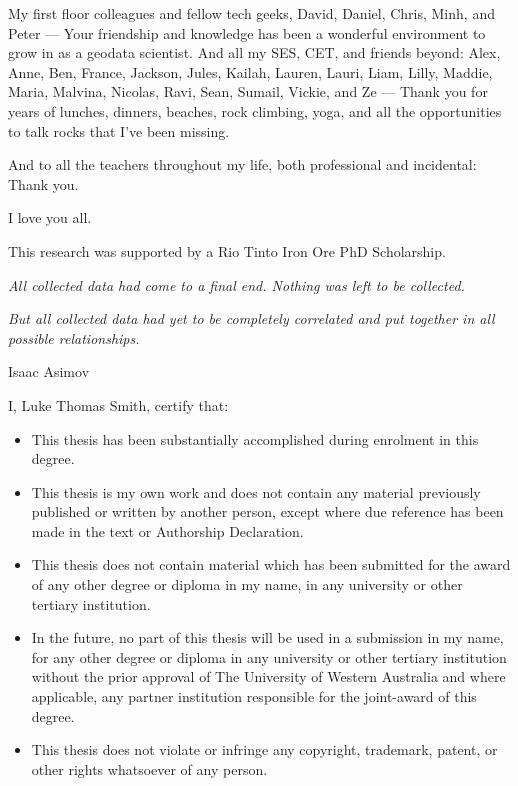 \documentclass[12pt,a4paper,notitlepage]{report} %
\begin{document}
My first floor colleagues and fellow tech geeks, David, Daniel, Chris, Minh, and Peter --- Your friendship and knowledge has been a wonderful environment to grow in as a geodata scientist.
And all my SES, CET, and friends beyond: Alex, Anne, Ben, France, Jackson, Jules, Kailah, Lauren, Lauri, Liam, Lilly, Maddie, Maria, Malvina, Nicolas, Ravi, Sean, Sumail, Vickie, and Ze --- Thank you for years of lunches, dinners, beaches, rock climbing, yoga, and all the opportunities to talk rocks that I've been missing.

And to all the teachers throughout my life, both professional and incidental: Thank you.

I love you all.

\bigskip
\noindent This research was supported by a Rio Tinto Iron Ore PhD Scholarship.

\vfill{}
\epigraph{
    \textit{All collected data had come to a final end. Nothing was left to be collected.}

    \smallskip
    \textit{But all collected data had yet to be completely correlated and put together in all possible relationships.}}{Isaac Asimov}


\newpage{}
\tableofcontents{}
\listoffigures{}

\newpage{}
I, Luke Thomas Smith, certify that:
\begin{itemize}
    \item{}This thesis has been substantially accomplished during enrolment in this degree.
    \item{}This thesis is my own work and does not contain any material previously published or written by another person, except where due reference has been made in the text or Authorship Declaration.
    \item{}This thesis does not contain material which has been submitted for the award of any other degree or diploma in my name, in any university or other tertiary institution.
    \item{}In the future, no part of this thesis will be used in a submission in my name, for any other degree or diploma in any university or other tertiary institution without the prior approval of The University of Western Australia and where applicable, any partner institution responsible for the joint-award of this degree.
    \item{}This thesis does not violate or infringe any copyright, trademark, patent, or other rights whatsoever of any person.
\end{itemize}
\end{document}
